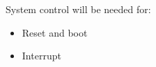 System control will be needed for:
\begin{itemize}
  \item Reset and boot
  \item Interrupt
\end{itemize}